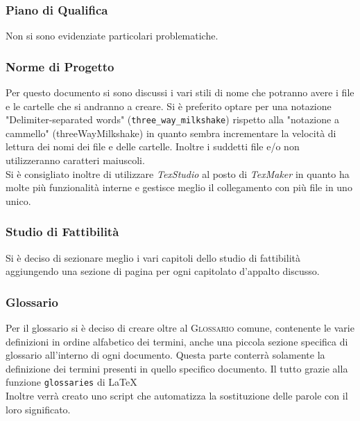 \subsubsection{Piano di Qualifica}
Non si sono evidenziate particolari problematiche.


\subsubsection{Norme di Progetto}
Per questo documento si sono discussi i vari stili di nome che potranno avere i file e le cartelle che si andranno a creare. Si è preferito optare per una notazione "Delimiter-separated words" (\texttt{three\_way\_milkshake}) rispetto alla "notazione a cammello" (threeWayMilkshake) in quanto sembra incrementare la velocità di lettura dei nomi dei file e delle cartelle. Inoltre i suddetti file e/o non utilizzeranno caratteri maiuscoli.\\
Si è consigliato inoltre di utilizzare \textit{TexStudio} al posto di \textit{TexMaker} in quanto ha molte più funzionalità interne e gestisce meglio il collegamento con più file in uno unico.

\subsubsection{Studio di Fattibilità}
Si è deciso di sezionare meglio i vari capitoli dello studio di fattibilità aggiungendo una sezione di pagina per ogni capitolato d'appalto discusso.

\subsubsection{Glossario}
Per il glossario si è deciso di creare oltre al \textsc{Glossario} comune, contenente le varie definizioni in ordine alfabetico dei termini, anche una piccola sezione specifica di glossario all'interno di ogni documento. Questa parte conterrà solamente la definizione dei termini presenti in quello specifico documento. Il tutto grazie alla funzione \texttt{glossaries} di \LaTeX\.\\
Inoltre verrà creato uno script che automatizza la sostituzione delle parole con il loro significato.
 
